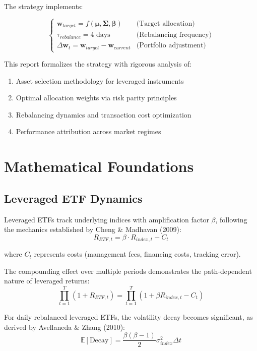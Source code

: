 \documentclass[onecolumn,11pt]{IEEEtran}
\begin{document}
The strategy implements:


\begin{equation*}
\begin{cases}
\mathbf{w}_{target} = f(\boldsymbol{\mu}, \boldsymbol{\Sigma}, \boldsymbol{\beta}) & \text{(Target allocation)} \\
\tau_{rebalance} = 4 \text{ days} & \text{(Rebalancing frequency)} \\
\Delta \mathbf{w}_t = \mathbf{w}_{target} - \mathbf{w}_{current} & \text{(Portfolio adjustment)}
\end{cases}
\end{equation*}

This report formalizes the strategy with rigorous analysis of:
\begin{enumerate}
    \item Asset selection methodology for leveraged instruments
    \item Optimal allocation weights via risk parity principles
    \item Rebalancing dynamics and transaction cost optimization
    \item Performance attribution across market regimes
\end{enumerate}

\section{Mathematical Foundations}

\subsection{Leveraged ETF Dynamics}

Leveraged ETFs track underlying indices with amplification factor $\beta$, following the mechanics established by Cheng \& Madhavan (2009):
\begin{equation}
R_{ETF,t} = \beta \cdot R_{index,t} - C_t
\end{equation}

where $C_t$ represents costs (management fees, financing costs, tracking error).

The compounding effect over multiple periods demonstrates the path-dependent nature of leveraged returns:
\begin{equation}
\prod_{t=1}^T (1 + R_{ETF,t}) = \prod_{t=1}^T (1 + \beta R_{index,t} - C_t)
\end{equation}

For daily rebalanced leveraged ETFs, the volatility decay becomes significant, as derived by Avellaneda \& Zhang (2010):
\begin{equation}
\mathbb{E}[\text{Decay}] = \frac{\beta(\beta-1)}{2} \sigma^2_{index} \Delta t
\end{equation}
\end{document}
